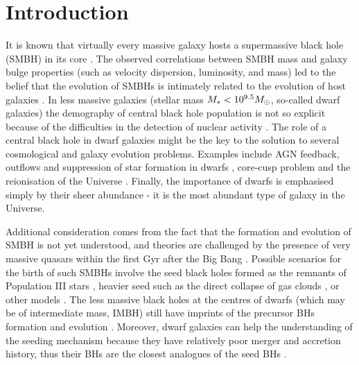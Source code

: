 \documentclass[fleqn,usenatbib]{mnras}
\newcommand{\stmass}{M_{\rm *}}
\newcommand{\msun}{M_\odot}
\begin{document}


\section{Introduction}
\label{sect:intro}


It is known that virtually every massive galaxy hosts a supermassive black hole (SMBH) in its core \citep{Kormendy2013}. The observed correlations between SMBH mass and galaxy bulge properties (such as velocity dispersion, luminosity, and mass) led to the belief that the evolution of SMBHs is intimately related to the evolution of host galaxies \citep{Ferrarese2000, McConnell2013}. 
In less massive galaxies (stellar mass $\stmass<10^{9.5} \msun$, so-called dwarf galaxies) the demography of central black hole population is not so explicit because of the difficulties in the detection  of nuclear activity \citep{Greene2020, Reines2022}.
The role of a central black hole in dwarf galaxies might be the key to the solution to several cosmological and galaxy evolution problems. Examples include AGN feedback, outflows and suppression of star formation in dwarfs \citep{Calabro2017, Barai2019, Manzano-King2019, Ferre-Mateu2021}, core-cusp problem and the reionisation of the Universe \citep{Silk2017}. 
Finally, the importance of dwarfs is emphasised simply by their sheer abundance -  it is the most abundant type of galaxy in the Universe. 

Additional consideration comes from the fact that the formation and evolution of SMBH is not yet understood, and theories are challenged by the presence of very massive quasars within the first Gyr after the Big Bang  \citep{Volonteri2010, Woods2019, Lusso2023}. Possible scenarios for the birth of such SMBHs involve the seed black holes formed as the remnants of Population III stars \citep{Madau2001}, heavier seed such as the direct collapse of gas clouds \citep{Loeb1994}, or other models \citep{Mezcua2017}. The less massive black holes at the centres of dwarfs (which may be of intermediate mass, IMBH) still have imprints of the precursor BHs formation and evolution \citep{Volonteri2010}. Moreover, dwarf galaxies can  help the understanding of the seeding mechanism because they have relatively poor merger and accretion history, thus their BHs are the closest analogues of the seed BHs \citep{Mezcua2017, Zubovas2019, Greene2020, Reines2022, Burke2023}. 
\end{document}
